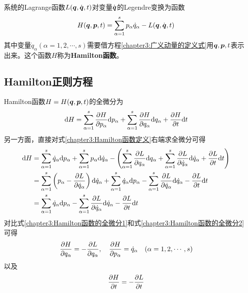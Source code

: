 系统的Lagrange函数$L(\boldsymbol{q},\dot{\boldsymbol{q}},t)$对变量$\dot{\boldsymbol{q}}$的Legendre变换为函数
\begin{equation}
	H(\boldsymbol{q},\boldsymbol{p},t) = \sum_{\alpha=1}^s p_\alpha\dot{q}_\alpha - L(\boldsymbol{q},\dot{\boldsymbol{q}},t)
	\label{chapter3:Hamilton函数定义}
\end{equation}
其中变量$\dot{q}_\alpha(\alpha=1,2,\cdots,s)$需要借方程\eqref{chapter3:广义动量的定义式}用$\boldsymbol{q},\boldsymbol{p},t$表示出来。这个函数$H$称为{\bf Hamilton函数}。

\subsection{Hamilton正则方程}

Hamilton函数$H=H(\boldsymbol{q},\boldsymbol{p},t)$的全微分为
\begin{equation}
	\mathrm{d} H = \sum_{\alpha=1}^s \frac{\partial H}{\partial p_\alpha} \mathrm{d} p_\alpha + \sum_{\alpha=1}^s \frac{\partial H}{\partial q_\alpha} \mathrm{d} q_\alpha + \frac{\partial H}{\partial t} \mathrm{d} t
	\label{chapter3:Hamilton函数的全微分1}
\end{equation}
另一方面，直接对式\eqref{chapter3:Hamilton函数定义}右端求全微分可得
\begin{align}
	\mathrm{d} H & = \sum_{\alpha=1}^s \dot{q}_\alpha\mathrm{d} p_\alpha + \sum_{\alpha=1}^s p_\alpha\mathrm{d} \dot{q}_\alpha - \left(\sum_{\alpha=1}^s \frac{\partial L}{\partial q_\alpha}\mathrm{d} q_\alpha + \sum_{\alpha=1}^s \frac{\partial L}{\partial \dot{q}_\alpha}\mathrm{d} \dot{q}_\alpha + \frac{\partial L}{\partial t} \mathrm{d} t\right) \nonumber \\
	& = \sum_{\alpha=1}^s \left(p_\alpha - \frac{\partial L}{\partial \dot{q}_\alpha}\right) \mathrm{d} \dot{q}_\alpha + \sum_{\alpha=1}^s \dot{q}_\alpha\mathrm{d} p_\alpha - \sum_{\alpha=1}^s \frac{\partial L}{\partial \dot{q}_\alpha}\mathrm{d} \dot{q}_\alpha - \frac{\partial L}{\partial t} \mathrm{d} t \nonumber \\
	& = \sum_{\alpha=1}^s \dot{q}_\alpha\mathrm{d} p_\alpha - \sum_{\alpha=1}^s \frac{\partial L}{\partial \dot{q}_\alpha}\mathrm{d} \dot{q}_\alpha - \frac{\partial L}{\partial t} \mathrm{d} t
	\label{chapter3:Hamilton函数的全微分2}
\end{align}
对比式\eqref{chapter3:Hamilton函数的全微分1}和式\eqref{chapter3:Hamilton函数的全微分2}可得
\begin{equation}
	\frac{\partial H}{\partial q_\alpha} = -\frac{\partial L}{\partial q_\alpha},\quad \frac{\partial H}{\partial p_\alpha} = \dot{q}_\alpha\quad (\alpha=1,2,\cdots,s)
	\label{chapter3:正则方程-初步}
\end{equation}
以及
\begin{equation}
	\frac{\partial H}{\partial t} = -\frac{\partial L}{\partial t}
	\label{chapter3:正则方程-初步推论}
\end{equation}
